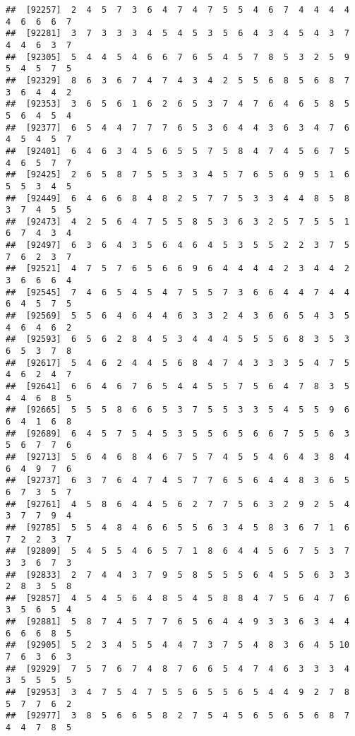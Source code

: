 \documentclass[
]{book}
\begin{document}
\begin{verbatim}
##  [92257]  2  4  5  7  3  6  4  7  4  7  5  5  4  6  7  4  4  4  4  4  6  6  6  7
##  [92281]  3  7  3  3  3  4  5  4  5  3  5  6  4  3  4  5  4  3  7  4  4  6  3  7
##  [92305]  5  4  4  5  4  6  6  7  6  5  4  5  7  8  5  3  2  5  9  5  4  5  7  5
##  [92329]  8  6  3  6  7  4  7  4  3  4  2  5  5  6  8  5  6  8  7  3  6  4  4  2
##  [92353]  3  6  5  6  1  6  2  6  5  3  7  4  7  6  4  6  5  8  5  5  6  4  5  4
##  [92377]  6  5  4  4  7  7  7  6  5  3  6  4  4  3  6  3  4  7  6  4  5  4  5  7
##  [92401]  6  4  6  3  4  5  6  5  5  7  5  8  4  7  4  5  6  7  5  4  6  5  7  7
##  [92425]  2  6  5  8  7  5  5  3  3  4  5  7  6  5  6  9  5  1  6  5  5  3  4  5
##  [92449]  6  4  6  6  8  4  8  2  5  7  7  5  3  3  4  4  8  5  8  3  7  4  5  5
##  [92473]  4  2  5  6  4  7  5  5  8  5  3  6  3  2  5  7  5  5  1  6  7  4  3  4
##  [92497]  6  3  6  4  3  5  6  4  6  4  5  3  5  5  2  2  3  7  5  7  6  2  3  7
##  [92521]  4  7  5  7  6  5  6  6  9  6  4  4  4  4  2  3  4  4  2  3  6  6  6  4
##  [92545]  7  4  6  5  4  5  4  7  5  5  7  3  6  6  4  4  7  4  4  6  4  5  7  5
##  [92569]  5  5  6  4  6  4  4  6  3  3  2  4  3  6  6  5  4  3  5  4  6  4  6  2
##  [92593]  6  5  6  2  8  4  5  3  4  4  4  5  5  5  6  8  3  5  3  6  5  3  7  8
##  [92617]  5  4  6  2  4  4  5  6  8  4  7  4  3  3  3  5  4  7  5  4  6  2  4  7
##  [92641]  6  6  4  6  7  6  5  4  4  5  5  7  5  6  4  7  8  3  5  4  4  6  8  5
##  [92665]  5  5  5  8  6  6  5  3  7  5  5  3  3  5  4  5  5  9  6  6  4  1  6  8
##  [92689]  6  4  5  7  5  4  5  3  5  5  6  5  6  6  7  5  5  6  3  5  6  7  7  6
##  [92713]  5  6  4  6  8  4  6  7  5  7  4  5  5  4  6  4  3  8  4  6  4  9  7  6
##  [92737]  6  3  7  6  4  7  4  5  7  7  6  5  6  4  4  8  3  6  5  6  7  3  5  7
##  [92761]  4  5  8  6  4  4  5  6  2  7  7  5  6  3  2  9  2  5  4  3  7  7  9  4
##  [92785]  5  5  4  8  4  6  6  5  5  6  3  4  5  8  3  6  7  1  6  7  2  2  3  7
##  [92809]  5  4  5  5  4  6  5  7  1  8  6  4  4  5  6  7  5  3  7  3  3  6  7  3
##  [92833]  2  7  4  4  3  7  9  5  8  5  5  5  6  4  5  5  6  3  3  2  8  3  5  8
##  [92857]  4  5  4  5  6  4  8  5  4  5  8  8  4  7  5  6  4  7  6  3  5  6  5  4
##  [92881]  5  8  7  4  5  7  7  6  5  6  4  4  9  3  3  6  3  4  4  6  6  6  8  5
##  [92905]  5  2  3  4  5  5  4  4  7  3  7  5  4  8  3  6  4  5 10  7  6  3  6  3
##  [92929]  7  5  7  6  7  4  8  7  6  6  5  4  7  4  6  3  3  3  4  3  5  5  5  5
##  [92953]  3  4  7  5  4  7  5  5  6  5  5  6  5  4  4  9  2  7  8  5  7  7  6  2
##  [92977]  3  8  5  6  6  5  8  2  7  5  4  5  6  5  6  5  6  8  7  4  4  7  8  5

\end{verbatim}
\end{document}
